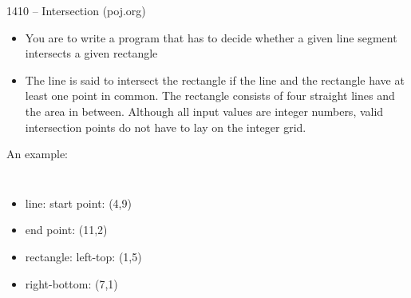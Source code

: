 \begin{frame}{1410 -- Intersection (poj.org)}
    \begin{itemize}
        \item You are to write a program that has to decide whether a given line segment intersects a given rectangle
        \item The line is said to intersect the rectangle if the line and the rectangle have at least one point in common. The rectangle consists of four straight lines and the area in between. Although all input values are integer numbers, valid intersection points do not have to lay on the integer grid.
    \end{itemize}  
    \begin{exampleblock}{An example:}
        \begin{columns}   
            \begin{itemize}
                \item line: start point: (4,9)
                \item end point: (11,2)
                \item rectangle: left-top: (1,5)
                \item right-bottom: (7,1)
            \end{itemize}
        \end{columns}
    \end{exampleblock}
\end{frame}
